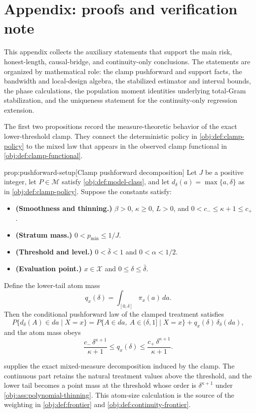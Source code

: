\section{Appendix: proofs and verification note}
\label{sec:appendix-proofs-verification}

This appendix collects the auxiliary statements that support the main risk, honest-length, causal-bridge, and continuity-only conclusions. The statements are organized by mathematical role: the clamp pushforward and support facts, the bandwidth and local-design algebra, the stabilized estimator and interval bounds, the phase calculations, the population moment identities underlying total-Gram stabilization, and the uniqueness statement for the continuity-only regression extension.

The first two propositions record the measure-theoretic behavior of the exact lower-threshold clamp. They connect the deterministic policy in \cref{obj:def:clamp-policy} to the mixed law that appears in the observed clamp functional in \cref{obj:def:clamp-functional}.

\begin{propositionv}{prop:pushforward-setup}[Clamp pushforward decomposition]
Let \(J\) be a positive integer, let \(P\in\mathcal M\) satisfy \cref{obj:def:model-class}, and let \(d_\delta(a)=\max\{a,\delta\}\) as in \cref{obj:def:clamp-policy}. Suppose the constants satisfy:
\begin{itemize}
\item \textbf{(Smoothness and thinning.)} \(\beta>0\), \(\kappa\geq 0\), \(L>0\), and \(0<c_-\leq \kappa+1\leq c_+\).
\item \textbf{(Stratum mass.)} \(0<p_{\min}\leq 1/J\).
\item \textbf{(Threshold and level.)} \(0<\bar\delta<1\) and \(0<\alpha<1/2\).
\item \textbf{(Evaluation point.)} \(x\in\mathcal X\) and \(0\leq\delta\leq\bar\delta\).
\end{itemize}
Define the lower-tail atom mass
\[
q_x(\delta)=\int_{[0,\delta]}\pi_x(a)\,da .
\]
Then the conditional pushforward law of the clamped treatment satisfies
\[
P\{d_\delta(A)\in da\mid X=x\}
=
P\{A\in da,\ A\in(\delta,1]\mid X=x\}
+
q_x(\delta)\,\delta_\delta(da),
\]
and the atom mass obeys
\[
\frac{c_-\,\delta^{\kappa+1}}{\kappa+1}
\leq
q_x(\delta)
\leq
\frac{c_+\,\delta^{\kappa+1}}{\kappa+1}.
\]
\end{propositionv}

 supplies the exact mixed-measure decomposition induced by the clamp. The continuous part retains the natural treatment values above the threshold, and the lower tail becomes a point mass at the threshold whose order is \(\delta^{\kappa+1}\) under \cref{obj:ass:polynomial-thinning}. This atom-size calculation is the source of the weighting in \cref{obj:def:frontier} and \cref{obj:def:continuity-frontier}.

